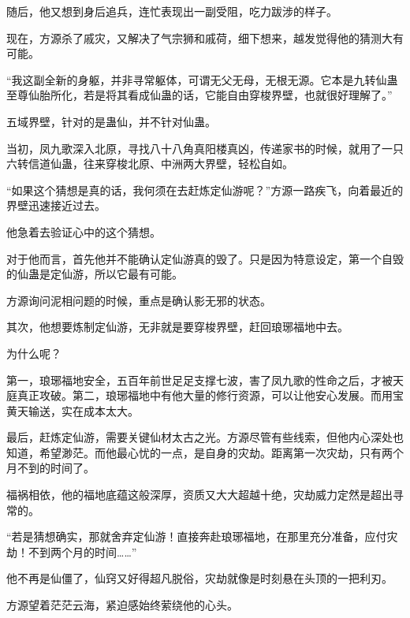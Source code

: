 \begin{this_body}
随后，他又想到身后追兵，连忙表现出一副受阻，吃力跋涉的样子。

现在，方源杀了戚灾，又解决了气宗狮和戚荷，细下想来，越发觉得他的猜测大有可能。

“我这副全新的身躯，并非寻常躯体，可谓无父无母，无根无源。它本是九转仙蛊至尊仙胎所化，若是将其看成仙蛊的话，它能自由穿梭界壁，也就很好理解了。”

五域界壁，针对的是蛊仙，并不针对仙蛊。

当初，凤九歌深入北原，寻找八十八角真阳楼真凶，传递家书的时候，就用了一只六转信道仙蛊，往来穿梭北原、中洲两大界壁，轻松自如。

“如果这个猜想是真的话，我何须在去赶炼定仙游呢？”方源一路疾飞，向着最近的界壁迅速接近过去。

他急着去验证心中的这个猜想。

对于他而言，首先他并不能确认定仙游真的毁了。只是因为特意设定，第一个自毁的仙蛊是定仙游，所以它最有可能。

方源询问泥相问题的时候，重点是确认影无邪的状态。

其次，他想要炼制定仙游，无非就是要穿梭界壁，赶回琅琊福地中去。

为什么呢？

第一，琅琊福地安全，五百年前世足足支撑七波，害了凤九歌的性命之后，才被天庭真正攻破。第二，琅琊福地中有他大量的修行资源，可以让他安心发展。而用宝黄天输送，实在成本太大。

最后，赶炼定仙游，需要关键仙材太古之光。方源尽管有些线索，但他内心深处也知道，希望渺茫。而他最心忧的一点，是自身的灾劫。距离第一次灾劫，只有两个月不到的时间了。

福祸相依，他的福地底蕴这般深厚，资质又大大超越十绝，灾劫威力定然是超出寻常的。

“若是猜想确实，那就舍弃定仙游！直接奔赴琅琊福地，在那里充分准备，应付灾劫！不到两个月的时间……”

他不再是仙僵了，仙窍又好得超凡脱俗，灾劫就像是时刻悬在头顶的一把利刃。

方源望着茫茫云海，紧迫感始终萦绕他的心头。

\end{this_body}

